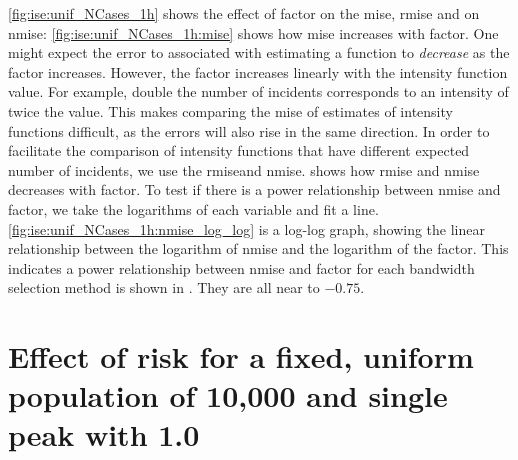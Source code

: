 \autoref{fig:ise:unif_NCases_1h} shows the effect of \gls{factor} on the \gls{mise}, \gls{rmise} and on \gls{nmise}:
\autoref{fig:ise:unif_NCases_1h:mise} shows how \gls{mise} increases with \gls{factor}.
One might expect the error to associated with estimating a function to \textit{decrease} as the \gls{factor} increases.
However, the \gls{factor} increases linearly with the intensity function value.
For example, double the number of incidents corresponds to an intensity of twice the value.
This makes comparing the \gls{mise} of estimates of intensity functions difficult,
as the errors will also rise in the same direction.
In order to facilitate the comparison of intensity functions that have different expected number of incidents,
we use the \gls{rmise}and \gls{nmise}.
 shows how \gls{rmise} and \gls{nmise} decreases with \gls{factor}.
To test if there is a power relationship between \gls{nmise} and \gls{factor},
we take the logarithms of each variable and fit a line.
\autoref{fig:ise:unif_NCases_1h:nmise_log_log} is a log-log graph,
showing the linear relationship between the logarithm of \gls{nmise} and the logarithm of the \gls{factor}.
This indicates a power relationship between \gls{nmise} and \gls{factor} for each bandwidth selection method is shown in .
They are all near to $-0.75$.




\section[Effect of risk spread with fixed population]
    {Effect of risk  for a fixed, uniform population of 10,000 and single peak with  1.0}
\label{sec:results:spread}

